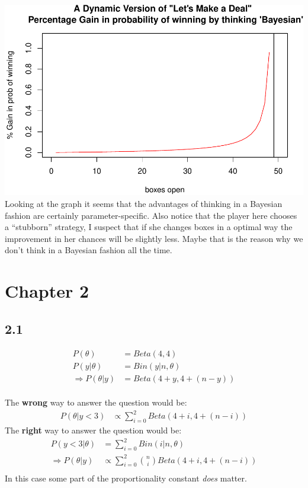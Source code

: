 \documentclass[]{article}
\begin{document}
\includegraphics{Untitled_files/figure-latex/unnamed-chunk-4-1.pdf}
Looking at the graph it seems that the advantages of thinking in a
Bayesian fashion are certainly parameter-specific. Also notice that the
player here chooses a ``stubborn'' strategy, I suspect that if she
changes boxes in a optimal way the improvement in her chances will be
slightly less. Maybe that is the reason why we don't think in a Bayesian
fashion all the time.

\section{Chapter 2}\label{chapter-2}

\subsection{2.1}\label{section-1}

\[
\begin{aligned}
P(\theta) &= Beta(4,4)  \\
P( y | \theta) &= Bin(y|n,\theta)  \\
\Rightarrow P(\theta|y) &= Beta(4+y,4+(n-y))
\end{aligned}
\]\\
The \textbf{wrong} way to answer the question would be:\\
\[
\begin{aligned}
P(\theta|y<3) &\propto \sum_{i=0}^{2}Beta(4+i,4+(n-i))
\end{aligned}
\] The \textbf{right} way to answer the question would be:\\
\[
\begin{aligned}
P( y<3 | \theta) &= \sum_{i=0}^{2}Bin(i|n,\theta)\\
\Rightarrow P(\theta|y) &\propto \sum_{i=0}^{2} {n \choose i} Beta(4+i,4+(n-i))\\  
\end{aligned}
\] In this case some part of the proportionality constant \emph{does}
matter.
\end{document}
